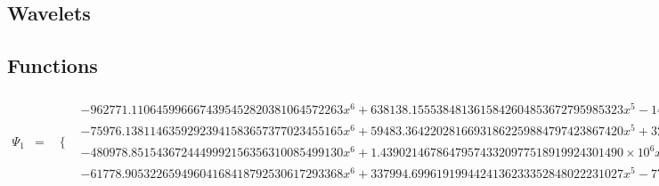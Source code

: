 \documentclass{article}
\begin{document}
 \begin{landscape}
\section{Wavelets}
\subsection{Functions}
 \begin{eqnarray*}
\Psi_1 & = & \begin{array}{cc}
 \{ & 
\begin{array}{cc}
 -962771.1106459966674395452820381064572263 x^6+638138.1555384813615842604853672795985323 x^5-145464.7516174103668765169811204034838569 x^4+13015.03646934811473724484319484262627291 x^3-361.3823228396999880352252284658308163075 x^2 & x\geq 0\land x<\frac{1}{4} \\
 -75976.13811463592923941583657377023455165 x^6+59483.36422028166931862259884797423867420 x^5+32103.92807012353775964798520508691296290 x^4-50664.71101300210780202902555715650657258 x^3+21341.93501728655425816448961913190667223 x^2-3903.961396835683522574460926579593381982 x+269.4913056393380467007888738685220204678 & x\geq \frac{1}{4}\land x<\frac{1}{2} \\
 -480978.8515436724449992156356310085499130 x^6+1.439021467864795743320977518919924301490\times 10^6 x^5-1.624167064915820345331540735852922142531\times 10^6 x^4+796876.2168252809862981617739372448776552 x^3-100813.4064632122068167565007894677070349 x^2-44436.46792304360289797565980902870059820 x+11866.50267914172467998036165458928120980 & x\geq \frac{1}{2}\land x<\frac{3}{4} \\
 -61778.90532265949604168418792530617293368 x^6+337994.6996191994424136233352848022231027 x^5-771188.0187275259402450871755274629980220 x^4+939246.8800353236336062830457285299789012 x^3-643939.0003028540136449430225426636100304 x^2+235589.3692498006516333740611374151975335 x-35925.02455128427772156605615531461855145 & x\geq \frac{3}{4}\land x<1
\end{array}


\end{array}
\end{eqnarray*}
\end{landscape}
\end{document}
